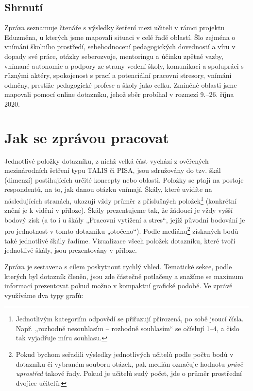 \documentclass[12pt,a4paper,]{report}
\begin{document}
\thispagestyle{empty}
\section*{Shrnutí}
Zpráva seznamuje čtenáře s výsledky šetření mezi učiteli v rámci projektu Eduzměna, u kterých jsme mapovali situaci v celé řadě oblastí. Šlo zejména o vnímání školního prostředí, sebehodnocení pedagogických dovedností a víru v dopady své práce, otázky seberozvoje, mentoringu a účinku zpětné vazby, vnímané autonomie a podpory ze strany vedení školy, komunikaci a spolupráci s různými aktéry, spokojenost s prací a potenciální pracovní stresory, vnímání odměny, prestiže pedagogické profese a školy jako celku. Zmíněné oblasti jsme mapovali pomocí online dotazníku, jehož sběr probíhal v rozmezí 9.--26. října 2020.


{
\renewcommand*\contentsname{Obsah zprávy}
\setcounter{tocdepth}{1}
\tableofcontents
}

\newpage

\hypertarget{jak-se-zpruxe1vou-pracovat}{%
\chapter{Jak se zprávou pracovat}\label{jak-se-zpruxe1vou-pracovat}}

Jednotlivé položky dotazníku, z nichž velká část vychází z ověřených mezinárodních šetření typu TALIS či PISA, jsou sdružovány do tzv. škál (dimenzí) postihujících určité koncepty nebo oblasti. Položky se ptají na postoje respondentů, na to, jak danou otázku vnímají. Škály, které uvidíte na následujících stranách, ukazují vždy průměr z příslušných položek\footnote{Jednotlivým kategoriím odpovědí se přiřazují přirozená, po sobě jsoucí čísla. Např. „rozhodně nesouhlasím -- rozhodně souhlasím`` se očíslují 1--4, a číslo tak vyjadřuje míru souhlasu.} (konkrétní znění je k vidění v příloze). Škály prezentujeme tak, že žádoucí je vždy vyšší bodový zisk (a to i u škály „Pracovní vytížení a stres``, jejíž původní bodování je pro jednotnost v tomto dotazníku „otočeno``). Podle mediánu\footnote{Pokud bychom seřadili výsledky jednotlivých učitelů podle počtu bodů v dotazníku či vybraném souboru otázek, pak medián označuje hodnotu \emph{právě uprostřed} takové řady. Pokud je učitelů sudý počet, jde o průměr prostřední dvojice učitelů.} získaných bodů také jednotlivé škály řadíme. Vizualizace všech položek dotazníku, které tvoří jednotlivé škály, jsou prezentovány v příloze.

Zpráva je sestavena s cílem poskytnout rychlý vhled. Tematické sekce, podle kterých byl dotazník členěn, jsou zde částečně potlačeny a snažíme se maximum informací prezentovat pokud možno v kompaktní grafické podobě. Ve zprávě využíváme dva typy grafů:
\end{document}
